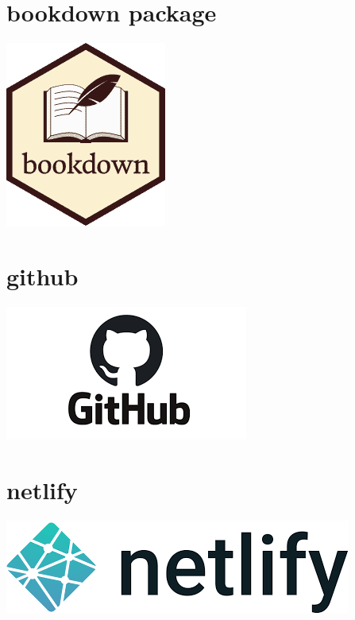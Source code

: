 \documentclass[
]{book}
\begin{document}
\hypertarget{bookdown-package}{%
\section{bookdown package}\label{bookdown-package}}

\begin{center}\includegraphics{_images/bookdown} \end{center}

\hypertarget{github}{%
\section{github}\label{github}}

\begin{center}\includegraphics{_images/github} \end{center}

\hypertarget{netlify}{%
\section{netlify}\label{netlify}}

\begin{center}\includegraphics{_images/netlify} \end{center}
\end{document}
